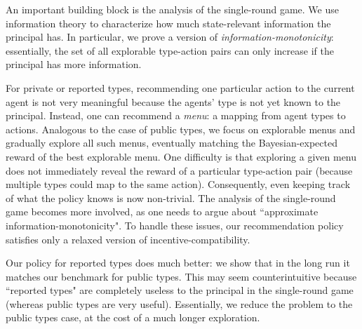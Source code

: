An important building block is the analysis of the single-round game. We use information theory to characterize how much state-relevant information the principal has. In particular, we prove a version of \emph{information-monotonicity}: essentially, the set of all explorable type-action pairs can only increase if the principal has more information.


For private or reported types, recommending one particular action to the current agent is not very meaningful because the agents' type is not yet known to the principal. Instead, one can recommend a \emph{menu}: a mapping from agent types to actions. Analogous to the case of public types, we focus on explorable menus and gradually explore all such menus, eventually matching the Bayesian-expected reward of the best explorable menu.
%
%
One difficulty is that exploring a given menu does not immediately reveal the reward of a particular type-action pair (because multiple types could map to the same action). Consequently, even keeping track of what the policy knows is now non-trivial. The analysis of the single-round game becomes more involved, as one needs to argue about ``approximate information-monotonicity". To handle these issues, our recommendation policy satisfies only a relaxed version of incentive-compatibility.

Our policy for reported types does much better: we show that in the long run it matches our benchmark for public types. This may seem counterintuitive because ``reported types" are completely useless to the principal in the single-round game (whereas public types are very useful). Essentially, we reduce the problem to the public types case, at the cost of a much longer exploration.

